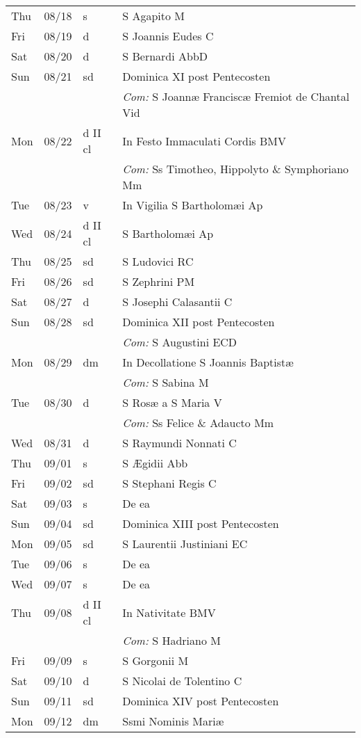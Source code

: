 \documentclass[10pt]{article}
\begin{document}
\begin{longtable}{ l l l l }
Thu & 08/18 & s & S Agapito M\\
Fri & 08/19 & d & S Joannis Eudes C\\
Sat & 08/20 & d & S Bernardi AbbD\\
Sun & 08/21 & sd & Dominica XI post Pentecosten\\
 & & & \textit{Com:} S Joannæ Franciscæ Fremiot de Chantal Vid\\
Mon & 08/22 & d II cl & In Festo Immaculati Cordis BMV\\
 & & & \textit{Com:} Ss Timotheo, Hippolyto \& Symphoriano Mm\\
Tue & 08/23 & v & In Vigilia S Bartholomæi Ap\\
Wed & 08/24 & d II cl & S Bartholomæi Ap\\
Thu & 08/25 & sd & S Ludovici RC\\
Fri & 08/26 & sd & S Zephrini PM\\
Sat & 08/27 & d & S Josephi Calasantii C\\
Sun & 08/28 & sd & Dominica XII post Pentecosten\\
 & & & \textit{Com:} S Augustini ECD\\
Mon & 08/29 & dm & In Decollatione S Joannis Baptistæ\\
 & & & \textit{Com:} S Sabina M\\
Tue & 08/30 & d & S Rosæ a S Maria V\\
 & & & \textit{Com:} Ss Felice \& Adaucto Mm\\
Wed & 08/31 & d & S Raymundi Nonnati C\\
Thu & 09/01 & s & S Ægidii Abb\\
Fri & 09/02 & sd & S Stephani Regis C\\
Sat & 09/03 & s & De ea\\
Sun & 09/04 & sd & Dominica XIII post Pentecosten\\
Mon & 09/05 & sd & S Laurentii Justiniani EC\\
Tue & 09/06 & s & De ea\\
Wed & 09/07 & s & De ea\\
Thu & 09/08 & d II cl & In Nativitate BMV\\
 & & & \textit{Com:} S Hadriano M\\
Fri & 09/09 & s & S Gorgonii M\\
Sat & 09/10 & d & S Nicolai de Tolentino C\\
Sun & 09/11 & sd & Dominica XIV post Pentecosten\\
Mon & 09/12 & dm & Ssmi Nominis Mariæ\\

\end{longtable}
\end{document}
